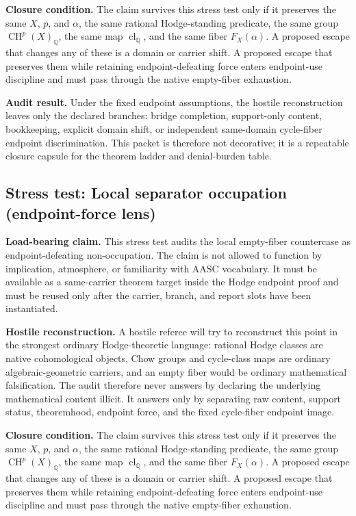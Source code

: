 \documentclass[11pt]{article}
\newcommand{\QQ}{\mathbb{Q}}
\newcommand{\CH}{\operatorname{CH}}
\newcommand{\clQ}{\operatorname{cl}_{\QQ}}
\begin{document}
\par\noindent\textbf{Closure condition.} The claim survives this stress test only if it preserves the same $X$, $p$, and $\alpha$, the same rational Hodge-standing predicate, the same group $\CH^p(X)_\QQ$, the same map $\clQ$, and the same fiber $F_X(\alpha)$. A proposed escape that changes any of these is a domain or carrier shift. A proposed escape that preserves them while retaining endpoint-defeating force enters endpoint-use discipline and must pass through the native empty-fiber exhaustion.

\par\noindent\textbf{Audit result.} Under the fixed endpoint assumptions, the hostile reconstruction leaves only the declared branches: bridge completion, support-only content, bookkeeping, explicit domain shift, or independent same-domain cycle-fiber endpoint discrimination. This packet is therefore not decorative; it is a repeatable closure capsule for the theorem ladder and denial-burden table.


\subsection{Stress test: Local separator occupation (endpoint-force lens)}

\par\noindent\textbf{Load-bearing claim.} This stress test audits the local empty-fiber countercase as endpoint-defeating non-occupation. The claim is not allowed to function by implication, atmosphere, or familiarity with AASC vocabulary. It must be available as a same-carrier theorem target inside the Hodge endpoint proof and must be reused only after the carrier, branch, and report slots have been instantiated.

\par\noindent\textbf{Hostile reconstruction.} A hostile referee will try to reconstruct this point in the strongest ordinary Hodge-theoretic language: rational Hodge classes are native cohomological objects, Chow groups and cycle-class maps are ordinary algebraic-geometric carriers, and an empty fiber would be ordinary mathematical falsification. The audit therefore never answers by declaring the underlying mathematical content illicit. It answers only by separating raw content, support status, theoremhood, endpoint force, and the fixed cycle-fiber endpoint image.

\par\noindent\textbf{Closure condition.} The claim survives this stress test only if it preserves the same $X$, $p$, and $\alpha$, the same rational Hodge-standing predicate, the same group $\CH^p(X)_\QQ$, the same map $\clQ$, and the same fiber $F_X(\alpha)$. A proposed escape that changes any of these is a domain or carrier shift. A proposed escape that preserves them while retaining endpoint-defeating force enters endpoint-use discipline and must pass through the native empty-fiber exhaustion.
\end{document}
